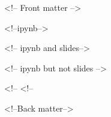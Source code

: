 <!-- Front matter -->



\endif


\endif


\endif


\endif


\endif


\endif
\endif


 <!--ipynb-->

 <!-- ipynb and slides-->

\else <!-- ipynb but not slides -->

\endif 
\else <!--%
 <!--%


\else

\endif
\endif


<!--Back matter-->




